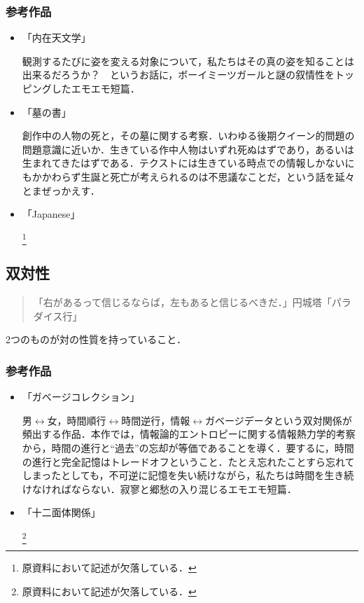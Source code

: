 \documentclass[10pt, a5paper, twoside]{jsarticle}
\begin{document}
			\subsubsection*{参考作品}

				\begin{itemize}
				
					\item 「内在天文学」

						観測するたびに姿を変える対象について，私たちはその真の姿を知ることは出来るだろうか？　というお話に，ボーイミーツガールと謎の叙情性をトッピングしたエモエモ短篇．

					\item 「墓の書」

						創作中の人物の死と，その墓に関する考察．いわゆる後期クイーン的問題の問題意識に近いか．生きている作中人物はいずれ死ぬはずであり，あるいは生まれてきたはずである．テクストには生きている時点での情報しかないにもかかわらず生誕と死亡が考えられるのは不思議なことだ，という話を延々とまぜっかえす．

					\item 「Japanese」

						\footnote{原資料において記述が欠落している．}

				\end{itemize}

		\subsection{双対性}

		\begin{quote}

			「右があるって信じるならば，左もあると信じるべきだ．」\hspace{\fill}円城塔「パラダイス行」

		\end{quote}

			2つのものが対の性質を持っていること．

			\subsubsection{参考作品}


				\begin{itemize}

				\item 「ガベージコレクション」

					男$ \leftrightarrow $女，時間順行$ \leftrightarrow $時間逆行，情報$ \leftrightarrow $ガベージデータという双対関係が頻出する作品．本作では，情報論的エントロピーに関する情報熱力学的考察から，時間の進行と“過去”の忘却が等価であることを導く．要するに，時間の進行と完全記憶はトレードオフということ．たとえ忘れたことすら忘れてしまったとしても，不可逆に記憶を失い続けながら，私たちは時間を生き続けなければならない．寂寥と郷愁の入り混じるエモエモ短篇．

				\item 「十二面体関係」

					\footnote{原資料において記述が欠落している．}

				\end{itemize}
\end{document}
